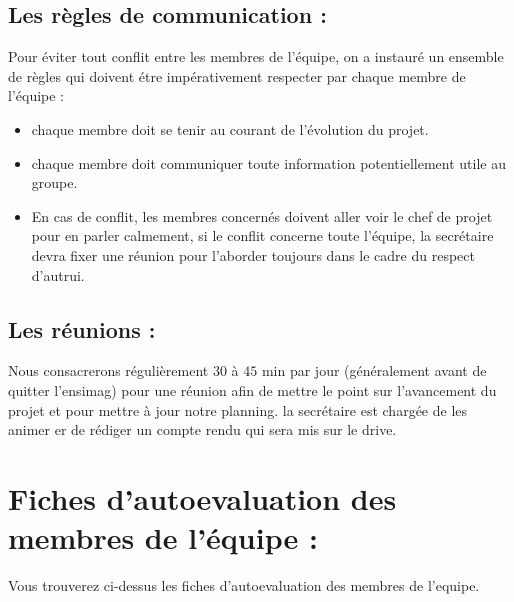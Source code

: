 \documentclass[12pt]{article}
\begin{document}
\subsection{Les règles de communication :}
Pour éviter tout conflit entre les membres de l'équipe, on a instauré un ensemble de règles qui doivent étre impérativement respecter par chaque membre de l'équipe :
\begin{itemize}
    \item chaque membre doit se tenir au courant de l'évolution du projet.
    \item chaque membre doit communiquer toute information potentiellement utile au groupe.
    \item En cas de conflit, les membres concernés doivent aller voir le chef de projet pour en parler calmement, si le conflit concerne toute l'équipe, la secrétaire devra fixer une réunion pour l'aborder toujours dans le cadre du respect d'autrui.
\end{itemize}
\subsection{Les réunions :}

Nous consacrerons régulièrement $30$ à $45$  min par jour  (généralement avant de quitter l'ensimag) pour une réunion afin de mettre le point sur l'avancement du projet et pour mettre à jour notre planning. la secrétaire est chargée de les animer er de rédiger un compte rendu qui sera mis sur le drive. \\

\section{\textbf{Fiches d'autoevaluation des membres de l’équipe :}}
Vous trouverez ci-dessus les fiches d’autoevaluation des membres de l’equipe.





\end{document}
